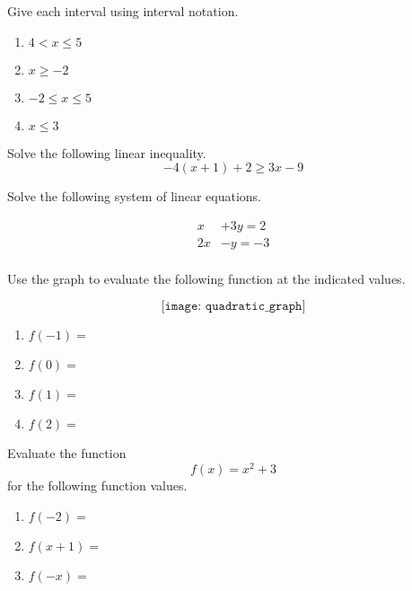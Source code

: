 \documentclass[addpoints,12pt]{exam}
\begin{document}
\begin{questions}
\question Give each interval using interval notation.
\begin{enumerate}[label = \alph*)]
    \item $ 4 < x \leq 5 $  \vspace{20pt} 
		\item $ x\geq  -2 $ \vspace{20pt} 
		\item $-2 \leq x \leq  5 $ \vspace{20pt} 
		\item $x \leq 3 $  \vspace{20pt} 
\end{enumerate}

\question Solve the following linear inequality. 
   \[
-4(x+1)+2\geq 3x-9
\]
\vfill
\begin{comment}
\question Solve the absolute value inequality 
\[
|3x-9| > 3
\]
\end{comment}

\question Solve the following system of linear equations. 

\begin{align*}
	x&+3y=2\\
	2x&-y=-3\\
\end{align*} 
\vfill

\newpage

\begin{comment}
\question Solve the system of linear equations 
\begin{align*}
	x&+2y=2 \\
		-4x&+3y = 25 \\
\end{align*}
\end{comment}


\question Use the graph to evaluate the following function at the indicated values.

\[
\texttt{[image: quadratic\_graph]}
\]

\begin{enumerate}[label = \alph*)]
    \item $f(-1) =  $ \vfill
		\item $f(0) = $ \vfill
		\item $f(1) = $ \vfill
		\item $f(2) = $ \vfill
\end{enumerate}


\question Evaluate the function
\[
f(x)=x^{2}+3
\]
for the following function values.
\begin{enumerate}[label = \alph*)]
    \item $f(-2)=$  \vfill
		\item $f(x+1)=$ \vfill
		\item $f(-x)=$ \vfill
\end{enumerate}


\end{questions}
\end{document}
